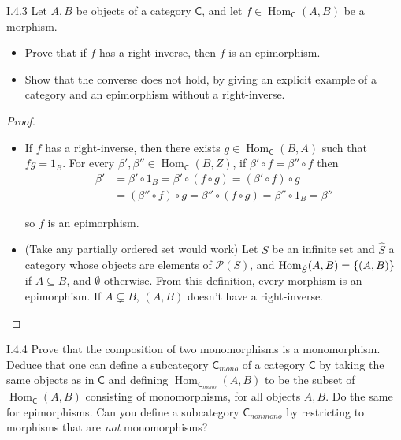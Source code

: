 \begin{exercise}{I.4.3}
	Let $A, B$ be objects of a category $\mathsf{C}$, and let $f\in \operatorname{Hom}_{\mathsf{C}}(A, B)$ be a morphism.
	\begin{itemize}
		\item Prove that if $f$ has a right-inverse, then $f$ is an epimorphism.
		\item Show that the converse does not hold, by giving an explicit example of a category and an epimorphism without a right-inverse.
	\end{itemize}
\end{exercise}

\begin{proof}
	\begin{itemize}
		\item If $f$ has a right-inverse, then there exists $g\in \operatorname{Hom}_{\mathsf{C}}(B, A)$ such that $fg = 1_{B}$. For every $\beta', \beta'' \in \operatorname{Hom}_{\mathsf{C}}(B, Z)$, if $\beta'\circ f = \beta''\circ f$ then
		      \begin{align*}
			      \beta' & = \beta'\circ 1_{B} = \beta'\circ (f\circ g) = (\beta'\circ f)\circ g              \\
			             & = (\beta''\circ f)\circ g = \beta''\circ (f\circ g) = \beta''\circ 1_{B} = \beta''
		      \end{align*}

		      so $f$ is an epimorphism.
		\item (Take any partially ordered set would work) Let $S$ be an infinite set and $\hat{S}$ a category whose objects are elements of $\mathscr{P}(S)$, and $\operatorname{Hom}_{\hat{S}}(A, B) = \left\{{(A, B)}\right\}$ if $A\subseteq B$, and $\emptyset$ otherwise. From this definition, every morphism is an epimorphism. If $A\subsetneq B$, $(A, B)$ doesn't have a right-inverse.
	\end{itemize}
\end{proof}

\begin{exercise}{I.4.4}
	Prove that the composition of two monomorphisms is a monomorphism. Deduce that one can define a subcategory ${\mathsf{C}}_{mono}$ of a category $\mathsf{C}$ by taking the same objects as in $\mathsf{C}$ and defining $\operatorname{Hom}_{{\mathsf{C}}_{mono}}(A, B)$ to be the subset of $\operatorname{Hom}_{\mathsf{C}}(A, B)$ consisting of monomorphisms, for all objects $A, B$. Do the same for epimorphisms. Can you define a subcategory $\mathsf{C}_{nonmono}$ by restricting to morphisms that are \textit{not} monomorphisms?
\end{exercise}

